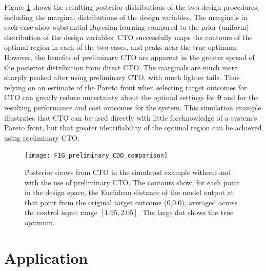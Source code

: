 \documentclass[12pt]{article}
\begin{document}
%
%
Figure \ref{fig:toy_sim_results} shows the resulting posterior distributions of the two design procedures, including the marginal distributions of the design variables. 
%
The marginals in each case show substantial Bayesian learning compared to the prior (uniform) distribution of the design variables. 
%
CTO successfully maps the contours of the optimal region in each of the two cases, and peaks near the true optimum. 
%
However, the benefits of preliminary CTO are apparent in the greater spread of the posterior distribution from direct CTO.
%
The marginals are much more sharply peaked after using preliminary CTO, with much lighter tails.
%
Thus relying on an estimate of the Pareto front when selecting target outcomes for CTO can greatly reduce uncertainty about the optimal settings for $\boldsymbol\theta$ and for the resulting performance and cost outcomes for the system.
%
%
This simulation example illustrates that CTO can be used directly with little foreknowledge of a system's Pareto front, but that greater identifiability of the optimal region can be achieved using preliminary CTO.

\begin{figure}
\centering
\texttt{[image: FIG\_preliminary\_CDO\_comparison]}
\caption{Posterior draws from CTO in the simulated example without and with the use of preliminary CTO. The contours show, for each point in the design space, the Euclidean distance of the model output at that point from the original target outcome (0,0,0), averaged across the control input range $[1.95,2.05]$. The large dot shows the true optimum.}
\label{fig:toy_sim_results}
\end{figure}



\section{Application}\label{application}
\end{document}
